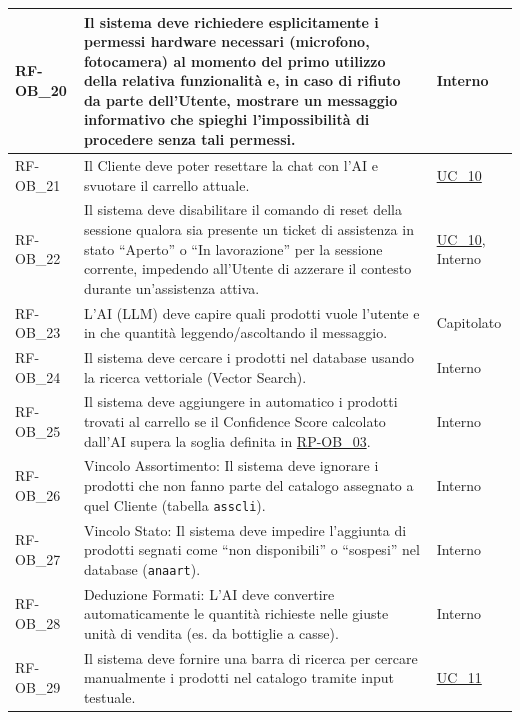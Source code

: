 \begin{longtable}{|>{\raggedright}p{}|>{\raggedright\arraybackslash}p{}|>{\raggedright\arraybackslash}p{}|}
    \hline
    RF-OB\_20 \hypertarget{rf-ob_20} & Il sistema deve richiedere esplicitamente i permessi hardware necessari (microfono, fotocamera) al momento del primo utilizzo della relativa funzionalità e, in caso di rifiuto da parte dell'Utente, mostrare un messaggio informativo che spieghi l'impossibilità di procedere senza tali permessi. & Interno \\
    \hline
    RF-OB\_21 \hypertarget{rf-ob_21} & Il Cliente deve poter resettare la chat con l'AI e svuotare il carrello attuale. & \hyperref[uc_10]{UC\_10} \\
    \hline
    RF-OB\_22 \hypertarget{rf-ob_22} & Il sistema deve disabilitare il comando di reset della sessione qualora sia presente un ticket di assistenza in stato ``Aperto'' o ``In lavorazione'' per la sessione corrente, impedendo all'Utente di azzerare il contesto durante un'assistenza attiva. & \hyperref[uc_10]{UC\_10}, Interno \\
    \hline
    RF-OB\_23 \hypertarget{rf-ob_23} & L'AI (LLM) deve capire quali prodotti vuole l'utente e in che quantità leggendo/ascoltando il messaggio. & Capitolato \\
    \hline
    RF-OB\_24 \hypertarget{rf-ob_24} & Il sistema deve cercare i prodotti nel database usando la ricerca vettoriale (Vector Search). & Interno \\
    \hline
    RF-OB\_25 \hypertarget{rf-ob_25} & Il sistema deve aggiungere in automatico i prodotti trovati al carrello se il Confidence Score calcolato dall'AI supera la soglia definita in \hyperlink{rp-ob_3}{RP-OB\_03}. & Interno \\
    \hline
    RF-OB\_26 \hypertarget{rf-ob_26} & Vincolo Assortimento: Il sistema deve ignorare i prodotti che non fanno parte del catalogo assegnato a quel Cliente (tabella \texttt{asscli}). & Interno \\
    \hline
    RF-OB\_27 \hypertarget{rf-ob_27} & Vincolo Stato: Il sistema deve impedire l'aggiunta di prodotti segnati come ``non disponibili'' o ``sospesi'' nel database (\texttt{anaart}). & Interno \\
    \hline
    RF-OB\_28 \hypertarget{rf-ob_28} & Deduzione Formati: L'AI deve convertire automaticamente le quantità richieste nelle giuste unità di vendita (es. da bottiglie a casse). & Interno \\
    \hline
    RF-OB\_29 \hypertarget{rf-ob_29} & Il sistema deve fornire una barra di ricerca per cercare manualmente i prodotti nel catalogo tramite input testuale. & \hyperref[uc_11]{UC\_11} \\

\end{longtable}
